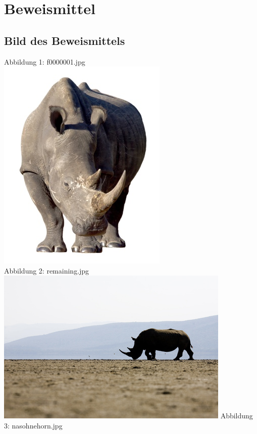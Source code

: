 \chapter{Beweismittel}

\section{Bild des Beweismittels}

Abbildung 1: f0000001.jpg\\
\includegraphics[scale=0.6]{bilder/f0000001.jpg }\\
Abbildung 2: remaining.jpg\\
\includegraphics[scale=0.6]{bilder/remaining.jpg }\newpage
Abbildung 3: nasohnehorn.jpg\\
